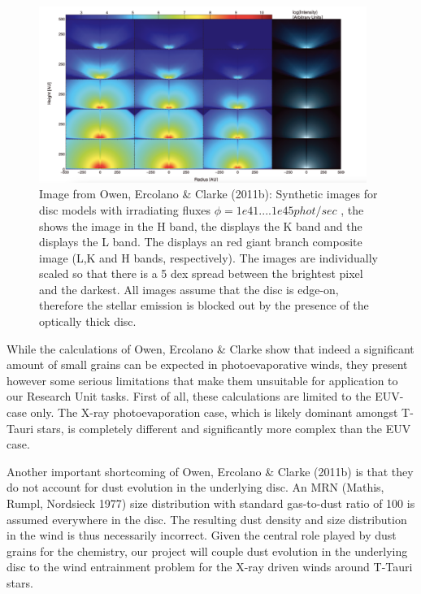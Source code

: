 \documentclass[10pt,fleqn,twoside]{article}
\begin{document}
\begin{figure}
  \includegraphics[width=0.95\textwidth]{wingnut.pdf}
  \caption{Image from Owen, Ercolano \& Clarke (2011b): Synthetic images for
    disc models with irradiating fluxes $\phi = 1e41.... 1e45 phot/sec$ ,
    the  shows the image in the H band,
    the  displays the K band and the
     displays the L band. The
     displays an red giant branch
    composite image (L,K and H bands, respectively). The images are
    individually scaled so that there is a 5 dex spread between the
    brightest pixel and the darkest. All images assume that the disc is
    edge-on, therefore the stellar emission is blocked out by the presence
    of the optically thick disc.}
  \label{fig:maps}
\end{figure}

While the calculations of Owen, Ercolano \& Clarke show that indeed a
significant amount of small grains can be expected in photoevaporative
winds, they present however
some serious limitations that make them unsuitable for application to our Research
Unit tasks. 
First of all, these calculations are limited to the EUV-case only. The
X-ray photoevaporation case, which is likely dominant amongst T-Tauri
stars, is completely different and significantly more complex than the EUV case. 

Another important shortcoming of Owen, Ercolano \& Clarke (2011b) is
that they do not account for dust evolution in the underlying disc. An
MRN (Mathis, Rumpl, Nordsieck 1977) size distribution with standard gas-to-dust ratio of 100 is
assumed everywhere in the disc. The resulting dust density and size
distribution in the wind is thus necessarily incorrect. Given the
central role played by dust grains for the chemistry, our project will
couple dust evolution in the underlying disc to the wind entrainment
problem for the X-ray driven winds around T-Tauri stars.  
\end{document}
